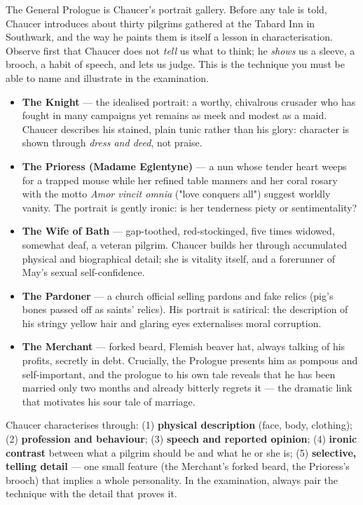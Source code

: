 \documentclass[11pt]{article}
\newcommand{\cle}[1]{{\popxbold\color{popdark}#1}}
\newcounter{popsec}
\newcounter{popsub}
\newcommand{\courssub}[1]{%
  \stepcounter{popsub}%
  \par\vspace{9pt}\noindent{\popxbold\fontsize{11.5}{13}\selectfont\color{popink}{\color{poporange}\thepopsec.\thepopsub}\hspace{6pt}#1}\par\nopagebreak\vspace{4pt}
}
\begin{document}
\courssub{Review of Characters in The General Prologue}

The \cle{General Prologue} is Chaucer's portrait gallery. Before any tale is told, Chaucer introduces about thirty pilgrims gathered at the Tabard Inn in Southwark, and the way he paints them is itself a lesson in \cle{characterisation}. Observe first that Chaucer does not \emph{tell} us what to think; he \emph{shows} us a sleeve, a brooch, a habit of speech, and lets us judge. This is the technique you must be able to name and illustrate in the examination.

\begin{exemplebox}
\begin{itemize}
\item \textbf{The Knight} — the idealised portrait: a worthy, chivalrous crusader who has fought in many campaigns yet remains as meek and modest as a maid. Chaucer describes his stained, plain tunic rather than his glory: character is shown through \emph{dress and deed}, not praise.
\item \textbf{The Prioress (Madame Eglentyne)} — a nun whose tender heart weeps for a trapped mouse while her refined table manners and her coral rosary with the motto \emph{Amor vincit omnia} ("love conquers all") suggest worldly vanity. The portrait is gently ironic: is her tenderness piety or sentimentality?
\item \textbf{The Wife of Bath} — gap-toothed, red-stockinged, five times widowed, somewhat deaf, a veteran pilgrim. Chaucer builds her through accumulated physical and biographical detail; she is vitality itself, and a forerunner of May's sexual self-confidence.
\item \textbf{The Pardoner} — a church official selling pardons and fake relics (pig's bones passed off as saints' relics). His portrait is satirical: the description of his stringy yellow hair and glaring eyes externalises moral corruption.
\item \textbf{The Merchant} — forked beard, Flemish beaver hat, always talking of his profits, secretly in debt. Crucially, the Prologue presents him as pompous and self-important, and the prologue to his own tale reveals that he has been married only two months and already bitterly regrets it — the \cle{dramatic link} that motivates his sour tale of marriage.
\end{itemize}
\end{exemplebox}

\begin{aretenir}
Chaucer characterises through: (1) \textbf{physical description} (face, body, clothing); (2) \textbf{profession and behaviour}; (3) \textbf{speech and reported opinion}; (4) \textbf{ironic contrast} between what a pilgrim should be and what he or she is; (5) \textbf{selective, telling detail} — one small feature (the Merchant's forked beard, the Prioress's brooch) that implies a whole personality. In the examination, always pair the technique with the detail that proves it.
\end{aretenir}
\end{document}
